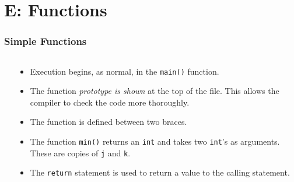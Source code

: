 \section{E: Functions}

\begin{frame}[fragile]
\frametitle{Simple Functions}
\begin{columns}

\begin{column}{0.40\textwidth}

\end{column}

\begin{column}{0.50\textwidth}
\begin{itemize}[<+->]
\item Execution begins, as normal, in the \verb^main()^ function.
\item The function {\it prototype is shown} at the top of the file.
This allows the compiler to check the code more thoroughly.
\item The function is defined between two braces.
\item The function \verb^min()^ returns an \verb^int^ and takes
two \verb^int^'s as arguments. These are copies of {\tt j} and {\tt k}.
\item The \verb^return^ statement is used to return a value
to the calling statement.
\end{itemize}
\end{column}

\end{columns}
\end{frame}



